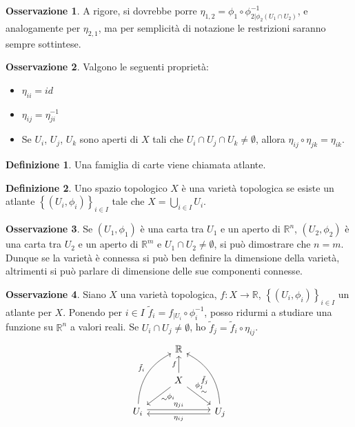\documentclass[a4paper,11pt]{article}
\theoremstyle{definition}
\newtheorem{osservazione}{Osservazione}[section]
\newtheorem{definizione}{Definizione}[section]
\theoremstyle{theorem}
\begin{document}
\begin{osservazione}
	A rigore, si dovrebbe porre $\eta_{1,2}=\phi_1\circ\phi^{-1}_{2|\phi_2(U_1\cap U_2)}$, e analogamente per $\eta_{2,1}$, ma per semplicità di notazione le restrizioni saranno sempre sottintese.
\end{osservazione}
\begin{osservazione}
	Valgono le seguenti proprietà:
	\begin{itemize}
		\item $\eta_{ii}=id$
		\item $\eta_{ij}=\eta_{ji}^{-1}$
		\item Se $U_i$, $U_j$, $U_k$ sono aperti di $X$ tali che $U_i\cap U_j\cap U_k\neq\emptyset$, allora $\eta_{ij}\circ\eta_{jk}=\eta_{ik}$.
	\end{itemize}
\end{osservazione}
\begin{definizione}
	Una famiglia di carte viene chiamata atlante.
\end{definizione}
\begin{definizione}
	Uno spazio topologico $X$ è una varietà topologica se esiste un atlante $\left\{(U_i,\phi_i)\right\}_{i\in I}$ tale che $X=\bigcup_{i\in I}U_i$. 
\end{definizione}
\begin{osservazione}
	Se $(U_1,\phi_1)$ è una carta tra $U_1$ e un aperto di $\mathbb{R}^n$, $(U_2,\phi_2)$ è una carta tra $U_2$ e un aperto di $\mathbb{R}^m$ e $U_1\cap U_2\neq\emptyset$, si può dimostrare che $n=m$. Dunque se la varietà è connessa si può ben definire la dimensione della varietà, altrimenti si può parlare di dimensione delle sue componenti connesse.
\end{osservazione}
\begin{osservazione}
	Siano $X$ una varietà topologica, $f\colon X\to\mathbb{R}$, $\left\{(U_i,\phi_i)\right\}_{i\in I}$ un atlante per $X$. Ponendo per $i\in I$ $\tilde{f}_i=f_{|U_i}\circ\phi_i^{-1}$, posso ridurmi a studiare una funzione su $\mathbb{R}^n$ a valori reali. Se $U_i\cap U_j\neq\emptyset$, ho $\tilde{f}_j=\tilde{f}_i\circ\eta_{ij}$.
	\[\begin{tikzcd}
	& \mathbb{R} \\
	& X \arrow[dl, "\sim", "\phi_i" near start] \arrow[u, "f"] \arrow[dr, "\sim", "\phi_j" near start] \\
	U_i\arrow[uur, bend left, "\tilde{f}_i"] \arrow[rr, "\eta_{ji}", shift left=0.5ex] &  & U_j \arrow[uul, bend right, "\tilde{f}_j"] \arrow[ll, "\eta_{ij}", shift left=0.5ex]
	\end{tikzcd}\]
\end{osservazione}
\end{document}

